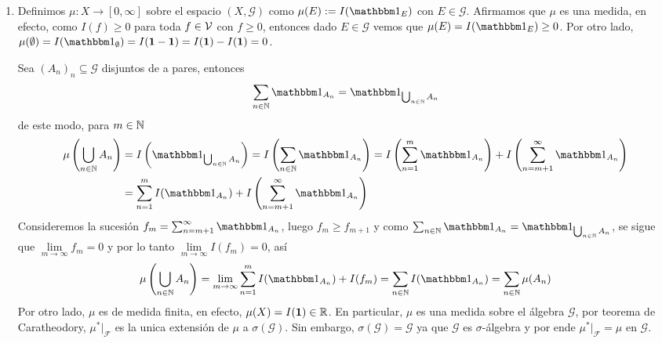 \documentclass{article}
\begin{document}
\begin{enumerate}
    \item Definimos $\mu:X\to[0,\infty]$ sobre el espacio $(X,\mathcal{G})$ como
    $\mu(E):=I(\I_{E})$ con $E\in\mathcal{G}$. Afirmamos que $\mu$ es una medida, en efecto, como
    $I(f)\geq0$ para toda $f\in\mathcal{V}$ con $f\geq0$, entonces dado $E\in\mathcal{G}$ vemos que 
    $\mu(E)=I(\I_{E})\geq0$. Por otro lado, $\mu(\emptyset)=I(\I_{\emptyset})=I(\textbf{1}
    -\textbf{1})=I(\textbf{1})-I(\textbf{1})=0$.
    
    \vspace{4mm}
    \noindent Sea $(A_{n})_{n}\subseteq\mathcal{G}$ disjuntos de a pares, entonces
    \begin{equation*}
        \sum_{n\in\N}\I_{A_{n}}=\I_{\bigcup_{n\in\N}A_{n}}
    \end{equation*}
    de este modo, para $m\in\mathbb{N}$
    \begin{align*}
        \mu\left(\bigcup_{n\in\N}A_{n}\right) &= I\left(\I_{\bigcup_{n\in\N}A_{n}}\right)
        =I\left(\sum_{n\in\N}\I_{A_{n}}\right)=I\left(\sum_{n=1}^{m}\I_{A_{n}}\right)+
        I\left(\sum_{n=m+1}^{\infty}\I_{A_{n}}\right) \\
        &= \sum_{n=1}^{m}I(\I_{A_{n}})+I\left(\sum_{n=m+1}^{\infty}\I_{A_{n}}\right)
    \end{align*}
    Consideremos la sucesión $f_{m}=\sum_{n=m+1}^{\infty}\I_{A_{n}}$, luego $f_{m}\geq f_{m+1}$
    y como $\sum_{n\in\N}\I_{A_{n}}=\I_{\bigcup_{n\in\N}A_{n}}$, se sigue que 
    $\lim\limits_{m\to\infty}f_{m}=0$ y por lo tanto $\lim\limits_{m\to\infty}I(f_{m})=0$, así
    \begin{equation*}
        \mu\left(\bigcup_{n\in\N}A_{n}\right)=\lim\limits_{m\to\infty}
        \sum_{n=1}^{m}I(\I_{A_{n}})+I(f_{m})=\sum_{n\in\N}I(\I_{A_{n}})=\sum_{n\in\N}\mu(A_{n})
    \end{equation*}
    Por otro lado, $\mu$ es de medida finita, en efecto, $\mu(X)=I(\textbf{1})\in\mathbb{R}$. En 
    particular, $\mu$ es una medida sobre el álgebra $\mathcal{G}$, por teorema de Caratheodory, 
    $\mu^{*}\big|_{\mathcal{F}}$ es la unica extensión de $\mu$ a $\sigma(\mathcal{G})$. 
    Sin embargo, $\sigma(\mathcal{G})=\mathcal{G}$ ya que $\mathcal{G}$ es $\sigma$-álgebra y por 
    ende $\mu^{*}\big|_{\mathcal{F}}=\mu$ en $\mathcal{G}$.
    

\end{enumerate}
\end{document}
